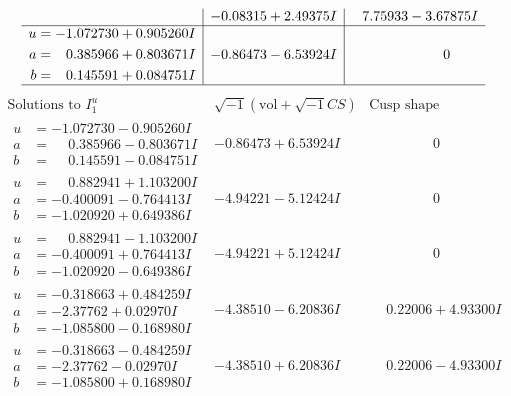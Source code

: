 \documentclass[1p]{elsarticle_modified}
\theoremstyle{definition}
\newcommand{\I}{\sqrt{-1}}
\begin{document}
$$\begin{array}{c|c|c}
 & -0.08315 + 2.49375 I & \phantom{-}7.75933 - 3.67875 I \\ \hline\begin{aligned}
u &= -1.072730 + 0.905260 I \\
a &= \phantom{-}0.385966 + 0.803671 I \\
b &= \phantom{-}0.145591 + 0.084751 I\end{aligned}
 & -0.86473 - 6.53924 I & \phantom{-0.000000 } 0\\
 \hline 
 \end{array}$$\newpage$$\begin{array}{c|c|c}  
\text{Solutions to }I^u_{1}& \I (\text{vol} + \sqrt{-1}CS) & \text{Cusp shape}\\
 \hline 
\begin{aligned}
u &= -1.072730 - 0.905260 I \\
a &= \phantom{-}0.385966 - 0.803671 I \\
b &= \phantom{-}0.145591 - 0.084751 I\end{aligned}
 & -0.86473 + 6.53924 I & \phantom{-0.000000 } 0 \\ \hline\begin{aligned}
u &= \phantom{-}0.882941 + 1.103200 I \\
a &= -0.400091 - 0.764413 I \\
b &= -1.020920 + 0.649386 I\end{aligned}
 & -4.94221 - 5.12424 I & \phantom{-0.000000 } 0 \\ \hline\begin{aligned}
u &= \phantom{-}0.882941 - 1.103200 I \\
a &= -0.400091 + 0.764413 I \\
b &= -1.020920 - 0.649386 I\end{aligned}
 & -4.94221 + 5.12424 I & \phantom{-0.000000 } 0 \\ \hline\begin{aligned}
u &= -0.318663 + 0.484259 I \\
a &= -2.37762 + 0.02970 I \\
b &= -1.085800 - 0.168980 I\end{aligned}
 & -4.38510 - 6.20836 I & \phantom{-}0.22006 + 4.93300 I \\ \hline\begin{aligned}
u &= -0.318663 - 0.484259 I \\
a &= -2.37762 - 0.02970 I \\
b &= -1.085800 + 0.168980 I\end{aligned}
 & -4.38510 + 6.20836 I & \phantom{-}0.22006 - 4.93300 I \\ \hline\begin{aligned}

\end{aligned}
\end{array}$$
\end{document}
